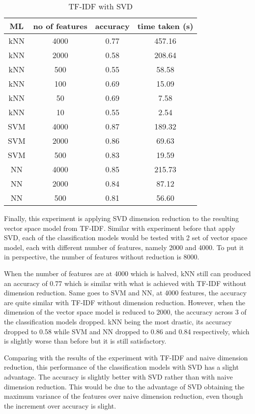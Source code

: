 \begin{table} [ht]
	\centering
	\begin{tabular}{|| c | c | c | c||}
		\hline
		ML & no of features & accuracy & time taken (s) \\ [0.5ex]
		\hline\hline
		kNN & 4000 & 0.77 & 457.16 \\
		\hline
		kNN & 2000 & 0.58 & 208.64 \\ 
		\hline
		kNN & 500 & 0.55 & 58.58 \\ 
		\hline
		kNN & 100 & 0.69 & 15.09 \\
		\hline
		kNN & 50 & 0.69 & 7.58 \\ 
		\hline
		kNN & 10 & 0.55 & 2.54 \\ 
		\hline\hline
		SVM & 4000 & 0.87 & 189.32 \\
		\hline
		SVM & 2000 & 0.86 & 69.63 \\
		\hline
		SVM & 500 & 0.83 & 19.59 \\
		\hline\hline
		NN & 4000 & 0.85 & 215.73 \\
		\hline
		NN & 2000 & 0.84 & 87.12 \\
		\hline
		NN & 500 & 0.81 & 56.60 \\
		\hline
	\end{tabular}
\caption{TF-IDF with SVD}
\label{tbl:tfidfSvd}
\end{table}

Finally, this experiment is applying SVD dimension reduction to the resulting vector space model from TF-IDF. Similar with experiment before that apply SVD, each of the classification models would be tested with 2 set of vector space model, each with different number of features, namely 2000 and 4000. To put it in perspective, the number of features without reduction is 8000. 

When the number of features are at 4000 which is halved, kNN still can produced an accuracy of 0.77 which is similar with what is achieved with TF-IDF without dimension reduction. Same goes to SVM and NN, at 4000 features, the accuracy are quite similar with TF-IDF without dimension reduction. However, when the dimension of the vector space model is reduced to 2000, the accuracy across 3 of the classification models dropped. kNN being the most drastic, its accuracy dropped to 0.58 while SVM and NN dropped to 0.86 and 0.84 respectively, which is slightly worse than before but it is still satisfactory.

Comparing with the results of the experiment with TF-IDF and naive dimension reduction, this performance of the classification models with SVD has a slight advantage. The accuracy is slightly better with SVD rather than with naive dimension reduction. This would be due to the advantage of SVD obtaining the maximum variance of the features over naive dimension reduction, even though the increment over accuracy is slight.

